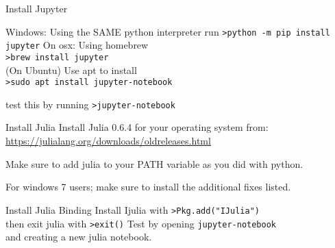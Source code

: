 \documentclass[11pt,reqno]{beamer}
\begin{document}
\begin{frame}{Install Jupyter}

Windows: Using the SAME python interpreter run \texttt{>python -m pip install jupyter}
\vfill
On osx: Using homebrew\\
 \texttt{>brew install jupyter}\\
\vfill
(On Ubuntu) Use apt to install\\
\texttt{>sudo apt install jupyter-notebook}\\
\vfill

test this by running \texttt{>jupyter-notebook}
\end{frame}
\begin{frame}{Install Julia}
Install Julia 0.6.4 for your operating system from:\\
\url{https://julialang.org/downloads/oldreleases.html}\\
\vfill

Make sure to add julia to your PATH variable as you did with python.

\vfill 
For windows 7 users; make sure to install the additional fixes listed.
\end{frame}
\begin{frame}{Install Julia  Binding}
Install Ijulia with
\texttt{>Pkg.add("IJulia")}\\
then exit julia with \texttt{>exit()}
\vfill
Test by opening
\texttt{jupyter-notebook}\\
and creating a new julia notebook.
\end{frame}
\end{document}
